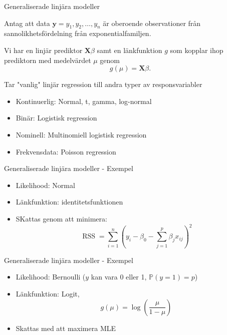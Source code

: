 \documentclass[10pt,english]{beamer}
\begin{document}
\begin{frame}{Generaliserade linjära modeller}

    Antag att data $\mathbf{y} = y_1, y_2, \ldots, y_n$ är oberoende observationer från sannolikhetsfördelning från exponentialfamiljen.

    Vi har en linjär prediktor $\mathbf{X} \beta$ samt en länkfunktion $g$ som kopplar ihop prediktorn med medelvärdet $\mu$ genom
    \begin{equation*}
        g(\mu) = \mathbf{X} \beta.
    \end{equation*}
    
    Tar "vanlig" linjär regression till andra typer av responsvariabler
    \begin{itemize}
        \item Kontinuerlig: Normal, t, gamma, log-normal
        \item Binär: Logistisk regression
        \item Nominell: Multinomiell logistisk regression
        \item Frekvensdata: Poisson regression
    \end{itemize}
\end{frame}

\begin{frame}{Generaliserade linjära modeller - Exempel}

    \begin{itemize}
        \item Likelihood: Normal
        \item L\"ankfunktion: identitetsfunktionen
        \item SKattas genom att minimera:
        \begin{equation*}
            \operatorname{RSS} = \sum_{i=1}^{n} \left( y_i - \beta_0 - \sum_{j=1}^{p} \beta_j x_{ij} \right)^2
        \end{equation*}
    \end{itemize}

\end{frame}

\begin{frame}{Generaliserade linjära modeller - Exempel}
    \begin{itemize}
        \item Likelihood: Bernoulli ($y$ kan vara 0 eller 1, $\mathbb{P}(y = 1) = p$)
        \item L\"ankfunktion: Logit,
        \begin{equation*}
            g(\mu) = \log\left( \frac{\mu}{1-\mu} \right)
        \end{equation*}
        \item Skattas med att maximera MLE
    \end{itemize}
\end{frame}
\end{document}
